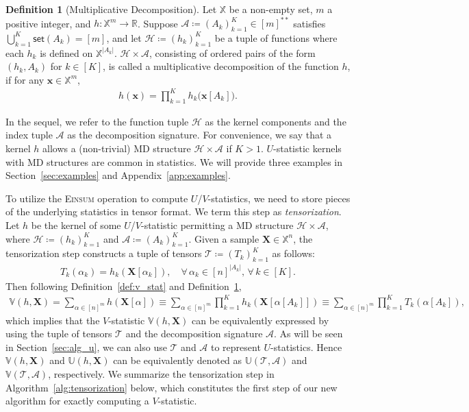 \documentclass[12pt]{article}
\theoremstyle{plain}
\theoremstyle{definition}
\newtheorem{definition}{Definition}
\def\Einsum{\textsc{Einsum}}
\newcommand{\ustat}{\mathbb{U}}
\newcommand{\vstat}{\mathbb{V}}
\newcommand{\samplespace}{\bbX}
\newcommand{\takesetp}[1]{\mathsf{set}(#1)}
\newcommand{\bbR}{{\mathbb{R}}}
\def\bbX{\mathbb{X}}
\def\calA{\mathcal{A}}
\def\calT{\mathcal{T}}
\def\calH{\mathcal{H}}
\begin{document}
\begin{bibunit}[agsm]
\begin{definition}[Multiplicative Decomposition]\label{def:mul_decomp}
Let $\samplespace$ be a non-empty set, $m$ a positive integer, and $h: \samplespace^m \to \bbR$. Suppose $\calA \coloneqq (A_k)_{k=1}^K \in [m]^{**}$ satisfies $\bigcup_{k=1}^K \takesetp{A_k} = [m]$, and let $\calH \coloneqq (h_k)_{k=1}^K$ be a tuple of functions where each $h_k$ is defined on $\samplespace^{|A_k|}$. $\calH \times \calA$, consisting of ordered pairs of the form $(h_{k}, A_{k})$ for $k \in [K]$, is called a multiplicative decomposition of the function $h$, if for any $\bm{x} \in \samplespace^m$, 
\begin{align*}
h(\bm{x}) = \prod_{k=1}^K h_k\big(\bm{x}[A_k]\big).
\end{align*}
\end{definition}
In the sequel, we refer to the function tuple $\calH$ as the kernel components and the index tuple $\calA$ as the decomposition signature. For convenience, we say that a kernel $h$ allows a (non-trivial) MD structure $\calH \times \calA$ if $K > 1$. $U$-statistic kernels with MD structures are common in statistics. We will provide three examples in Section~\ref{sec:examples} and Appendix~\ref{app:examples}.

To utilize the \Einsum{} operation to compute $U$/$V$-statistics, we need to store pieces of the underlying statistics in tensor format. We term this step as \emph{tensorization}. Let $h$ be the kernel of some $U$/$V$-statistic permitting a MD structure $\calH \times \calA$, where $\calH \coloneqq (h_k)_{k=1}^K$ and $\calA \coloneqq (A_k)^K_{k=1}$. Given a sample $\bm{X} \in \samplespace^n$, the tensorization step constructs a tuple of tensors $\calT \coloneqq (T_k)_{k=1}^K$ as follows:
\begin{align*}
T_k (\alpha_k) = h_k (\bm{X}[\alpha_k]), \quad \forall \, \alpha_k \in [n]^{|A_k|}, \, \forall \, k \in [K].
\end{align*}
Then following Definition~\ref{def:v_stat} and Definition~\ref{def:mul_decomp},
\begin{align}\label{eq:tensorization_v}
\vstat(h, \bm{X}) = \sum_{\alpha \in [n]^m} h(\bm{X}[\alpha]) \equiv \sum_{\alpha \in [n]^m} \prod_{k=1}^K h_k(\bm{X}[\alpha[A_k]]) \equiv \sum_{\alpha \in [n]^m} \prod_{k=1}^K T_k(\alpha[A_k]), 
\end{align}
which implies that the $V$-statistic $\vstat(h, \bm{X})$ can be equivalently expressed by using the tuple of tensors $\calT$ and the decomposition signature $\calA$. As will be seen in Section~\ref{sec:alg_u}, we can also use $\calT$ and $\calA$ to represent $U$-statistics. Hence $\vstat(h, \bm{X})$ and $\ustat(h, \bm{X})$ can be equivalently denoted as $\ustat(\calT, \calA)$ and $\vstat(\calT, \calA)$, respectively. We summarize the tensorization step in Algorithm~\ref{alg:tensorization} below, which constitutes the first step of our new algorithm for exactly computing a $V$-statistic.


\end{bibunit}
\end{document}
